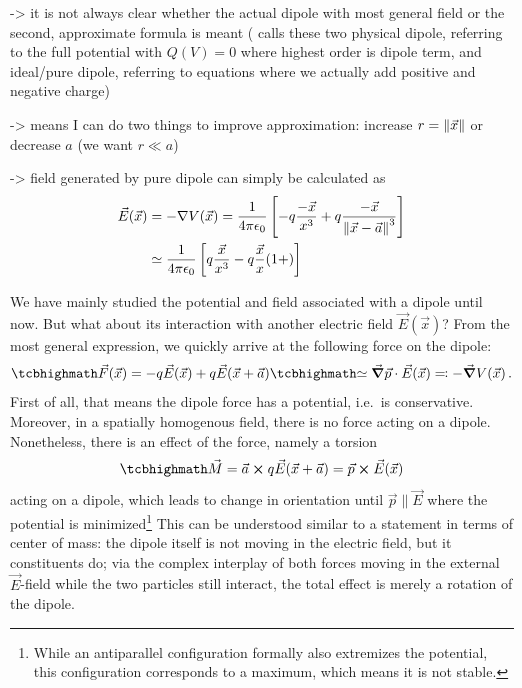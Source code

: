 \documentclass[../class_mech_main.tex]{subfiles}
\DeclareMathOperator{\fpeps}{\frac{1}{4 \pi \epsilon_0}}
\begin{document}
-> it is not always clear whether the actual dipole with most general field or the second, approximate formula is meant (\cite{Griffiths_2017} calls these two physical dipole, referring to the full potential with $Q(V) = 0$ where highest order is dipole term, and ideal/pure dipole, referring to equations where we actually add positive and negative charge)

-> means I can do two things to improve approximation: increase $r = \norm{\vec{x}}$ or decrease $a$ (we want $r \ll a$)


-> field generated by pure dipole can simply be calculated as
\begin{align}
    \vec{E}(\vec{x}) &= - \nabla V(\vec{x}) = \fpeps \qty[-q \frac{-\vec{x}}{x^3} + q \frac{-\vec{x}}{\norm{\vec{x} - \vec{a}}^3}]
    \\
    &\simeq \fpeps \qty[q \frac{\vec{x}}{x^3} - q \frac{\vec{x}}{x} (1 + )]
\end{align}



We have mainly studied the potential and field associated with a dipole until now. But what about its interaction with another electric field $\vec{E}(\vec{x})$? From the most general expression, we quickly arrive at the following force on the dipole:
\begin{equation}
    \eqbox{
        \vec{F}(\vec{x})
    }
    = - q \vec{E}(\vec{x}) + q \vec{E}(\vec{x} + \vec{a})
    \eqbox{
        \simeq \grad \vec{p} \cdot \vec{E}(\vec{x})
    }
    \eqqcolon - \grad V(\vec{x})
    \, .
\end{equation}
First of all, that means the dipole force has a potential, i.e.~is conservative. Moreover, in a spatially homogenous field, there is no force acting on a dipole. Nonetheless, there is an effect of the force, namely a torsion
\begin{equation}
    \eqbox{
        \vec{M}
        = \vec{a} \cross q \vec{E}(\vec{x} + \vec{a})
        = \vec{p} \cross \vec{E}(\vec{x})
    }
\end{equation}
acting on a dipole, which leads to change in orientation until $\vec{p} \parallel \vec{E}$ where the potential is minimized\footnote{While an antiparallel configuration formally also extremizes the potential, this configuration corresponds to a maximum, which means it is not stable.} This can be understood similar to a statement in terms of center of mass: the dipole itself is not moving in the electric field, but it constituents do; via the complex interplay of both forces moving in the external $\vec{E}$-field while the two particles still interact, the total effect is merely a rotation of the dipole.
\end{document}
